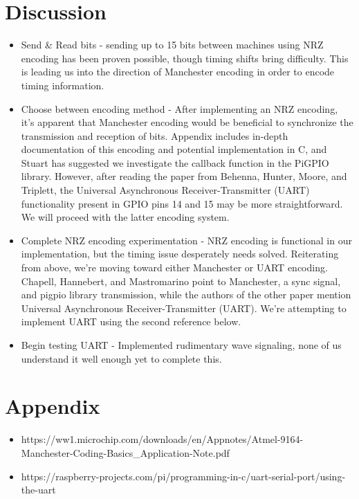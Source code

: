 \documentclass{article}
\begin{document}
\section*{Discussion}
\begin{itemize}
\item Send \& Read bits - sending up to 15 bits between machines using NRZ encoding has been proven possible, though timing shifts bring difficulty. This is leading us into the direction of Manchester encoding in order to encode timing information.
\item Choose between encoding method - After implementing an NRZ encoding, it's apparent that Manchester encoding would be beneficial to synchronize the transmission and reception of bits. Appendix includes in-depth documentation of this encoding and potential implementation in C, and Stuart has suggested we investigate the callback function in the PiGPIO library. However, after reading the paper from Behenna, Hunter, Moore, and Triplett, the Universal Asynchronous Receiver-Transmitter (UART) functionality present in GPIO pins 14 and 15 may be more straightforward. We will proceed with the latter encoding system.
\item Complete NRZ encoding experimentation - NRZ encoding is functional in our implementation, but the timing issue desperately needs solved. Reiterating from above, we're moving toward either Manchester or UART encoding. Chapell, Hannebert, and Mastromarino point to Manchester, a sync signal, and pigpio library transmission, while the authors of the other paper mention Universal Asynchronous Receiver-Transmitter (UART). We're attempting to implement UART using the second reference below.
\item Begin testing UART - Implemented rudimentary wave signaling, none of us understand it well enough yet to complete this.

\end{itemize}
\section*{Appendix}
\begin{itemize}
\item https://ww1.microchip.com/downloads/en/Appnotes/Atmel-9164-Manchester-Coding-Basics\_Application-Note.pdf
\item https://raspberry-projects.com/pi/programming-in-c/uart-serial-port/using-the-uart
\end{itemize}
\end{document}
